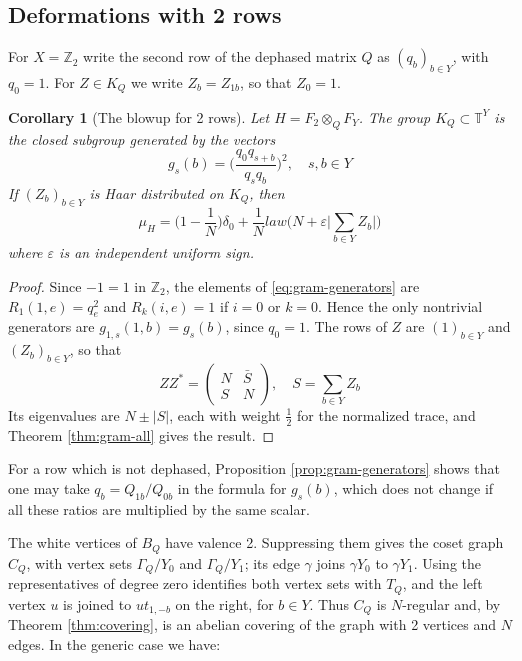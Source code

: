 \documentclass[11pt,reqno]{amsart}
\newtheorem{cor}[thm]{Corollary}
\theoremstyle{definition}
\numberwithin{equation}{section}
\begin{document}
\subsection{Deformations with 2 rows}

For $X=\mathbb Z_2$ write the second row of the dephased matrix $Q$ as $(q_b)_{b\in Y}$, with $q_0=1$. For $Z\in K_Q$ we write $Z_b=Z_{1b}$, so that $Z_0=1$.

\begin{cor}[The blowup for 2 rows]\label{cor:two-rows-abelian}
Let $H=F_2\otimes_QF_Y$. The group $K_Q\subset\mathbb T^Y$ is the closed subgroup generated by the vectors
$$g_s(b)=\Big(\frac{q_0q_{s+b}}{q_sq_b}\Big)^2,\quad s,b\in Y$$
If $(Z_b)_{b\in Y}$ is Haar distributed on $K_Q$, then
$$\mu_H=\Big(1-\frac1N\Big)\delta_0+\frac1N law\Big(N+\varepsilon\Big|\sum_{b\in Y}Z_b\Big|\Big)$$
where $\varepsilon$ is an independent uniform sign.
\end{cor}

\begin{proof}
Since $-1=1$ in $\mathbb Z_2$, the elements of \eqref{eq:gram-generators} are $R_1(1,e)=q_e^2$ and $R_k(i,e)=1$ if $i=0$ or $k=0$. Hence the only nontrivial generators are $g_{1,s}(1,b)=g_s(b)$, since $q_0=1$. The rows of $Z$ are $(1)_{b\in Y}$ and $(Z_b)_{b\in Y}$, so that
$$ZZ^*=\begin{pmatrix}N&\bar S\\S&N\end{pmatrix},
\quad S=\sum_{b\in Y}Z_b$$
Its eigenvalues are $N\pm|S|$, each with weight $\frac12$ for the normalized trace, and Theorem \ref{thm:gram-all} gives the result.
\end{proof}

For a row which is not dephased, Proposition \ref{prop:gram-generators} shows that one may take $q_b=Q_{1b}/Q_{0b}$ in the formula for $g_s(b)$, which does not change if all these ratios are multiplied by the same scalar.

The white vertices of $B_Q$ have valence 2. Suppressing them gives the coset graph $C_Q$, with vertex sets $\Gamma_Q/Y_0$ and $\Gamma_Q/Y_1$; its edge $\gamma$ joins $\gamma Y_0$ to $\gamma Y_1$. Using the representatives of degree zero identifies both vertex sets with $T_Q$, and the left vertex $u$ is joined to $ut_{1,-b}$ on the right, for $b\in Y$. Thus $C_Q$ is $N$-regular and, by Theorem \ref{thm:covering}, is an abelian covering of the graph with 2 vertices and $N$ edges. In the generic case we have:
\end{document}
